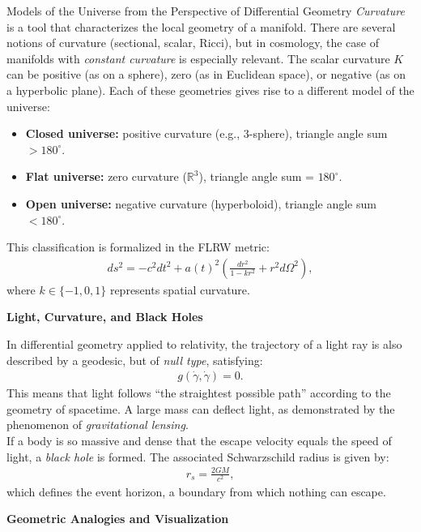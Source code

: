 \documentclass[final]{beamer}
\newlength{\colwidth}
\begin{document}
\begin{frame}[t]
\begin{columns}[t]
\begin{column}{\colwidth}
\begin{alertblock}{Models of the Universe from the Perspective of Differential Geometry}
      \textit{Curvature} is a tool that characterizes the local geometry of a manifold. There are several notions of curvature (sectional, scalar, Ricci), but in cosmology, the case of manifolds with \textit{constant curvature} is especially relevant. The scalar curvature \(K\) can be positive (as on a sphere), zero (as in Euclidean space), or negative (as on a hyperbolic plane). Each of these geometries gives rise to a different model of the universe:
        \begin{itemize}
          \item \textbf{Closed universe:} positive curvature (e.g., 3-sphere), triangle angle sum $> 180^\circ$.
          \item \textbf{Flat universe:} zero curvature ($\mathbb{R}^3$), triangle angle sum = $180^\circ$.
          \item \textbf{Open universe:} negative curvature (hyperboloid), triangle angle sum $< 180^\circ$.
        \end{itemize}
        This classification is formalized in the FLRW metric:
        \begin{align*}
        ds^2 = -c^2 dt^2 + a(t)^2 \left( \frac{dr^2}{1 - kr^2} + r^2 d\Omega^2 \right),
        \end{align*}
        where $k \in \{-1, 0, 1\}$ represents spatial curvature.
        
        \textbf{\Large Light, Curvature, and Black Holes}

          In differential geometry applied to relativity, the trajectory of a light ray is also described by a geodesic, but of \textit{null type}, satisfying:
          \begin{align*}
          g(\dot{\gamma}, \dot{\gamma}) = 0.
          \end{align*}
          This means that light follows “the straightest possible path” according to the geometry of spacetime. A large mass can deflect light, as demonstrated by the phenomenon of \textit{gravitational lensing}.\\
          If a body is so massive and dense that the escape velocity equals the speed of light, a \textit{black hole} is formed. The associated Schwarzschild radius is given by:
          \begin{align*}
          r_s = \frac{2GM}{c^2},
          \end{align*}
          which defines the event horizon, a boundary from which nothing can escape.
          
        \textbf{\large Geometric Analogies and Visualization}
        

\end{alertblock}
\end{column}
\end{columns}
\end{frame}
\end{document}
